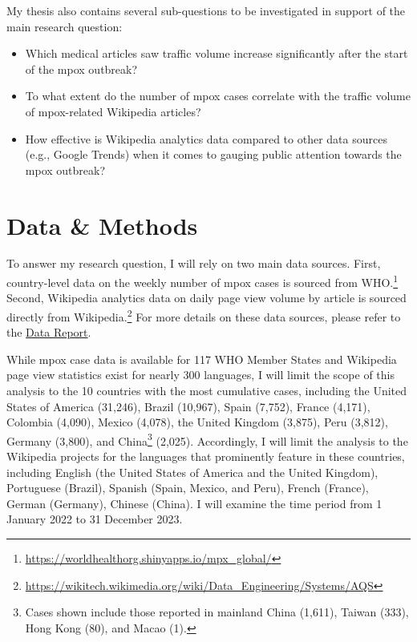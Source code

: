 \documentclass[
  letterpaper,
  DIV=11,
  numbers=noendperiod]{scrartcl}
\begin{document}
My thesis also contains several sub-questions to be investigated in
support of the main research question:

\begin{itemize}
\item
  Which medical articles saw traffic volume increase significantly after
  the start of the mpox outbreak?
\item
  To what extent do the number of mpox cases correlate with the traffic
  volume of mpox-related Wikipedia articles?
\item
  How effective is Wikipedia analytics data compared to other data
  sources (e.g., Google Trends) when it comes to gauging public
  attention towards the mpox outbreak?
\end{itemize}

\hypertarget{data-methods}{%
\section{Data \& Methods}\label{data-methods}}

To answer my research question, I will rely on two main data sources.
First, country-level data on the weekly number of mpox cases is sourced
from WHO.\footnote{\url{https://worldhealthorg.shinyapps.io/mpx_global/}}
Second, Wikipedia analytics data on daily page view volume by article is
sourced directly from Wikipedia.\footnote{\url{https://wikitech.wikimedia.org/wiki/Data_Engineering/Systems/AQS}}
For more details on these data sources, please refer to the
\href{https://rawcdn.githack.com/smkerr/Thesis_WorkInProgress/698d632e8fc01347022f33f5c1837399bba0f25e/proposal/data-report/data-report.html}{Data
Report}.

While mpox case data is available for 117 WHO Member States and
Wikipedia page view statistics exist for nearly 300 languages, I will
limit the scope of this analysis to the 10 countries with the most
cumulative cases, including the United States of America (31,246),
Brazil (10,967), Spain (7,752), France (4,171), Colombia (4,090), Mexico
(4,078), the United Kingdom (3,875), Peru (3,812), Germany (3,800), and
China\footnote{Cases shown include those reported in mainland China
  (1,611), Taiwan (333), Hong Kong (80), and Macao (1).} (2,025).
Accordingly, I will limit the analysis to the Wikipedia projects for the
languages that prominently feature in these countries, including English
(the United States of America and the United Kingdom), Portuguese
(Brazil), Spanish (Spain, Mexico, and Peru), French (France), German
(Germany), Chinese (China). I will examine the time period from 1
January 2022 to 31 December 2023.
\end{document}
